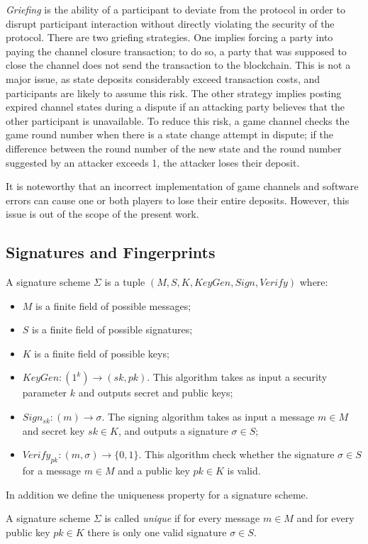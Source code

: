 \textit {Griefing} is the ability of a participant to deviate from the protocol in order to disrupt participant interaction without directly violating the security of the protocol. There are two griefing strategies. One implies forcing a party into paying the channel closure transaction; to do so, a party that was supposed to close the channel does not send the transaction to the blockchain. This is not a major issue, as state deposits considerably exceed transaction costs, and participants are likely to assume this risk. The other strategy implies posting expired channel states during a dispute if an attacking party believes that the other participant is unavailable. To reduce this risk, a game channel checks the game round number when there is a state change attempt in dispute; if the difference between the round number of the new state and the round number suggested by an attacker exceeds 1, the attacker loses their deposit.

It is noteworthy that an incorrect implementation of game channels and software errors can cause one or both players to lose their entire deposits. However, this issue is out of the scope of the present work.

	\subsection{Signatures and Fingerprints}
\begin{defn}
A signature scheme $ \Sigma $ is a tuple $(M, S, K, KeyGen, Sign, Verify)$ where:
	\begin{itemize}
		\item $ M $ is a finite field of possible messages;
		\item $ S $ is a finite field of possible signatures;
		\item $ K $ is a finite field of possible keys;
		\item $ KeyGen: (1^k) \rightarrow (sk, pk) $. This algorithm takes as input a security parameter $k$ and outputs secret and public keys;
		\item $Sign_{sk}: (m) \rightarrow \sigma $. The signing algorithm takes as input a message $m \in M$ and secret key $sk \in K$, and outputs a signature $\sigma \in S$;
	\item $Verify_{pk}: (m, \sigma) \rightarrow \{0, 1\} $. This algorithm check whether the signature $\sigma \in S$ for a message $m \in M$ and a public key $pk \in K$ is valid.
	\end{itemize}
\end{defn}
In addition we define the uniqueness property for a signature scheme. 
\begin{defn}
A signature scheme $ \Sigma $ is called \textit{unique} if for every message $m \in M$ and for every public key $pk \in K$ there is only one valid signature $\sigma \in S$.
\end{defn}

